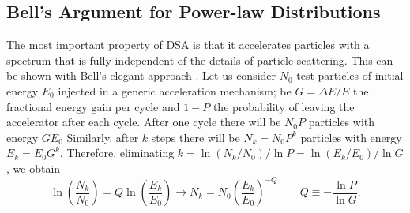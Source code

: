 \documentclass[varenna]{cimento}
\begin{document}
\subsection{Bell's Argument for Power-law Distributions}
The most important property of DSA is that it accelerates particles with a spectrum that is fully independent of the details of particle scattering. 
This can be shown with Bell's elegant approach \cite{bell78a}. 
Let us consider $N_0$ test particles of initial energy $E_0$ injected in a generic acceleration mechanism; 
be $G=\Delta E/E$ the fractional energy gain per cycle and  $1-P$ the probability of leaving the accelerator after each cycle. 
After one cycle there will be $N_0 P$ particles with energy $GE_0$
Similarly, after $k$ steps there will be $N_k=N_0P^k$ particles with energy $E_k=E_0G^k$. 
Therefore, eliminating $k= \ln{(N_k/N_0)/\ln P}=\ln{(E_k/E_0)/\ln G}$, we obtain
\begin{equation}\label{adef}	\ln\left(\frac{N_k}{N_0}\right)=Q\ln\left(\frac{E_k}{E_0}\right)\to 
N_k = N_0\left(\frac{E_k}{E_0}\right)^{-Q}
\qquad Q\equiv-\frac{\ln P}{\ln G}.
\end{equation}
\end{document}
